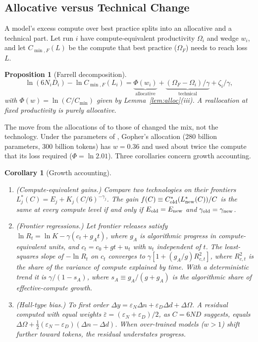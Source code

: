 \documentclass[AER,finalmode]{AEA}
\newtheorem{proposition}{Proposition}
\newtheorem{corollary}{Corollary}
\theoremstyle{definition}
\theoremstyle{remark}
\begin{document}
\subsection{Allocative versus Technical Change}\label{sec:farrell}

A model's excess compute over best practice splits into an allocative and a technical part. Let run $i$ have
compute-equivalent productivity $\Omega_i$ and wedge $w_i$, and let $C_{\min,F}(L)$ be the compute that best practice
($\Omega_F$) needs to reach loss $L$.

\begin{proposition}[Farrell decomposition]\label{prop:farrell}
\[
\ln(6N_iD_i)-\ln C_{\min,F}(L_i)=\underbrace{\Phi(w_i)}_{\text{allocative}}
+\underbrace{(\Omega_F-\Omega_i)/\gamma}_{\text{technical}}+\zeta_i/\gamma,
\]
with $\Phi(w)=\ln(C/C_{\min})$ given by Lemma~\ref{lem:alloc}(iii). A reallocation at fixed productivity is purely
allocative.
\end{proposition}

The move from the allocations of \citet{kaplan2020scaling} to those of \citet{hoffmann2022training} changed the mix, not
the technology. Under the parameters of \citet{besiroglu2024chinchilla}, Gopher's allocation (280 billion parameters,
300 billion tokens) has $w=0.36$ and used about twice the compute that its loss required ($\Phi=\ln2.01$). Three
corollaries concern growth accounting.

\begin{corollary}[Growth accounting]\label{cor:growth}
\begin{enumerate}
\item[(i)] (Compute-equivalent gains.) Compare two technologies on their frontiers
$L^*_j(C)=E_j+K_j(C/6)^{-\gamma_j}$. The gain $f(C)\equiv C^*_{\rm old}(L^*_{\rm new}(C))/C$ is the same at every
compute level if and only if $E_{\rm old}=E_{\rm new}$ and $\gamma_{\rm old}=\gamma_{\rm new}$.
\item[(ii)] (Frontier regressions.) Let frontier releases satisfy $\ln R_t=\ln K-\gamma(c_t+g_At)$, where $g_A$ is
algorithmic progress in compute-equivalent units, and $c_t=c_0+gt+u_t$ with $u_t$ independent of $t$. The
least-squares slope of $-\ln R_t$ on $c_t$ converges to $\gamma[1+(g_A/g)R^2_{c,t}]$, where $R^2_{c,t}$ is the share
of the variance of compute explained by time. With a deterministic trend it is $\gamma/(1-s_A)$, where
$s_A\equiv g_A/(g+g_A)$ is the algorithmic share of effective-compute growth.
\item[(iii)] (Hall-type bias.) To first order $\Delta y=\varepsilon_N\Delta n+\varepsilon_D\Delta d+\Delta\Omega$. A
residual computed with equal weights $\bar\varepsilon=(\varepsilon_N+\varepsilon_D)/2$, as $C=6ND$ suggests, equals
$\Delta\Omega+\tfrac12(\varepsilon_N-\varepsilon_D)(\Delta n-\Delta d)$. When over-trained models ($w>1$) shift
further toward tokens, the residual understates progress.
\end{enumerate}
\end{corollary}
\end{document}
